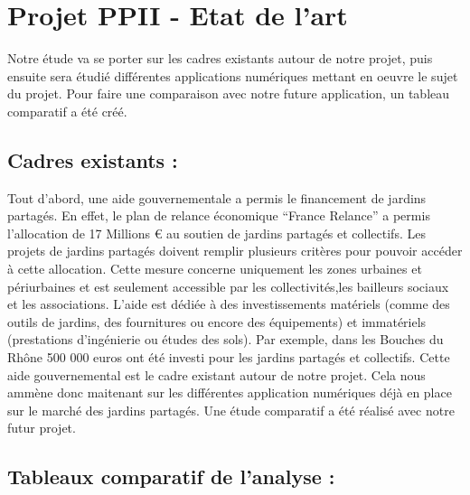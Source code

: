 \documentclass{article}
\begin{document}
\section*{Projet PPII - Etat de l'art}

    Notre étude va se porter sur les cadres existants autour de notre projet, puis ensuite sera étudié différentes applications numériques mettant en oeuvre le sujet du projet. Pour faire une comparaison avec notre future application, un tableau comparatif a été créé. 
\subsection*{Cadres existants :}

Tout d'abord, une aide gouvernementale a permis le financement de jardins partagés. En effet, le plan de relance économique “France Relance” a permis l’allocation de 17 Millions € au soutien de jardins partagés et collectifs. Les projets de jardins partagés doivent remplir plusieurs critères pour pouvoir accéder à cette allocation. Cette mesure concerne uniquement les zones urbaines et périurbaines et est seulement accessible par les collectivités,les bailleurs sociaux et les associations. L’aide est dédiée à des investissements matériels (comme des outils de jardins, des fournitures ou encore des équipements) et immatériels (prestations d'ingénierie ou études des sols). Par exemple, dans les Bouches du Rhône 500 000 euros ont été investi pour les jardins partagés et collectifs. Cette aide gouvernemental est le cadre existant autour de notre projet. Cela nous ammène donc maitenant sur les différentes application numériques déjà en place sur le marché des jardins partagés. Une étude comparatif a été réalisé avec notre futur projet. 


\subsection*{Tableaux comparatif de l'analyse :}
\end{document}
